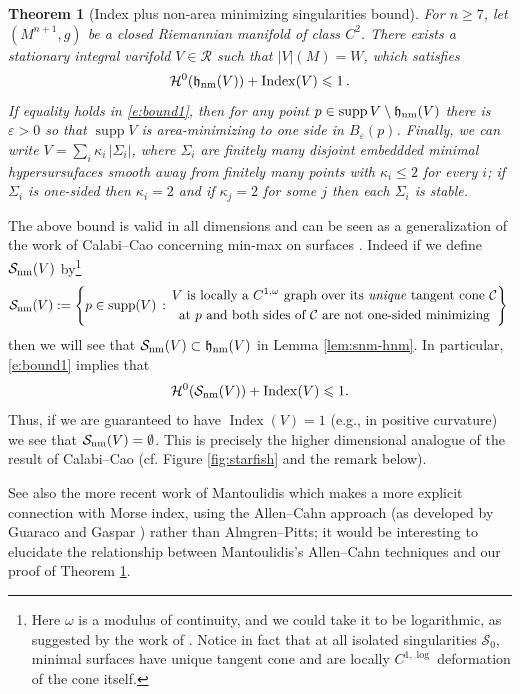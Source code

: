 \documentclass[12pt,twoside]{amsart}
\numberwithin{equation}{section}
\renewcommand{\leq}{\leqslant}
\renewcommand{\geq}{\geqslant}
\newtheorem{theorem}{Theorem}[section]
\newcommand{\Snm}{\mathcal{S}_{\textnormal{nm}}}
\newcommand{\cC}{\mathcal C}
\renewcommand{\cH}{\mathcal H}
\renewcommand{\cR}{\mathcal R}
\newcommand{\cS}{\mathcal S}
\DeclareMathOperator{\supp}{supp}
\newcommand{\eps}{\varepsilon}
\DeclareMathOperator{\Index}{Index}
\begin{document}
\begin{theorem}[Index plus non-area minimizing singularities bound]\label{thm:nm+index_bound}
For $n\geq 7$, let $(M^{n+1}, g)$ be a closed Riemannian manifold of class $C^2$. There exists a stationary integral varifold
	$V\in \cR$ such that $|V|(M)=W$, which satisfies 
\begin{equation}\label{e:bound1}
 \cH^{0} (\mathfrak{h}_\textnormal{nm}(V)) +\Index(V) \leq 1\,.
\end{equation}
If equality holds in \eqref{e:bound1}, then for any point $p\in \supp V\setminus \mathfrak{h}_\textnormal{nm}(V)$ there is $\eps>0$ so that $\supp V$ is area-minimizing to one side in $B_\eps(p)$. Finally, we can write $V=\sum_{i}\kappa_i\,|\Sigma_i|$, where $\Sigma_i$ are finitely many disjoint embeddded minimal hypersursufaces smooth away from finitely many points with  $\kappa_i\leq 2$ for every $i$; if $\Sigma_i$ is one-sided then $\kappa_i =2$ and if $\kappa_j=2$ for some $j$ then each $\Sigma_i$ is stable. 
\end{theorem}

The above bound is valid in all dimensions and can be seen as a generalization of the work of Calabi--Cao concerning min-max on surfaces \cite{CaCa}. Indeed if we define  $\Snm(V)$ by\footnote{Here $\omega$ is a modulus of continuity, and we could take it to be logarithmic, as suggested by the work of \cite{Simon}.  Notice in fact that at all isolated singularities $\cS_0$, minimal surfaces have unique tangent cone and are locally $C^{1,\log}$ deformation of the cone itself.}
\[
\Snm(V):= \left\{ p\in \supp(V)\,:\, \begin{gathered}
V \text{ is locally a $C^{1,\omega}$ graph over its \emph{unique} tangent cone $\cC$}\\
\text{at $p$ and both sides of $\cC$ are not one-sided minimizing} 
\end{gathered}  
\right\}\,
\]
then we will see that $\Snm(V) \subset \mathfrak{h}_\textrm{nm}(V)$ in Lemma \ref{lem:snm-hnm}. In particular, \eqref{e:bound1} implies that
\[
\cH^0(\Snm(V)) + \Index(V) \leq 1.
\]
Thus, if we are guaranteed to have $\Index(V) =1$ (e.g., in positive curvature) we see that $\Snm(V) = \emptyset$. This is precisely the higher dimensional analogue of the result of Calabi--Cao (cf. Figure \ref{fig:starfish} and the remark below). 

See also the more recent work of Mantoulidis \cite{mantoulidis} which makes a more explicit connection with Morse index, using the Allen--Cahn approach (as developed by Guaraco and Gaspar \cite{Guaraco,GasparGuaraco}) rather than Almgren--Pitts; it would be interesting to elucidate the relationship between Mantoulidis's Allen--Cahn techniques and our proof of Theorem \ref{thm:nm+index_bound}. 
\end{document}
